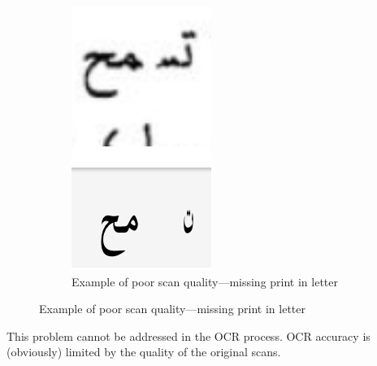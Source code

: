 \begin{figure}
	\begin{subfigure}[b]{0.9\linewidth}
	\centering
	\includegraphics[width=\textwidth]{images/image15.png}
	\caption{Example of poor scan quality—missing print in letter}
	\label{fig:fig28}
	\end{subfigure}
\end{figure} 

This problem cannot be addressed in the OCR process. OCR accuracy is
(obviously) limited by the quality of the original scans.

